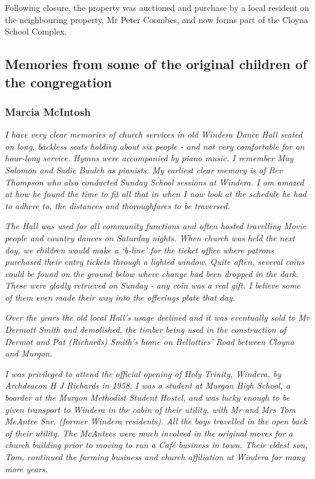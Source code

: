 Following closure, the property was auctioned and purchase by a local resident on the neighbouring property, Mr Peter Coombes, and now forms part of the Cloyna School Complex.



\subsection{Memories from some of the original children of the congregation}



\subsubsection{Marcia McIntosh}



\emph{I have very clear memories of church services in old Windera Dance Hall seated on long, backless seats holding about six people - and not very comfortable for an hour-long service. Hymns were accompanied by piano music. I remember May Solomon and Sadie Baulch as pianists. My earliest clear memory is of Rev Thompson who also conducted Sunday School sessions at Windera. I am amazed at how he found the time to fit all that in when I now look at the schedule he had to adhere to, the distances and thoroughfares to be traversed.}



\emph{The Hall was used for all community functions and often hosted travelling Movie people and country dances on Saturday nights. When church was held the next day, we children would make a `b-line' for the ticket office where patrons purchased their entry tickets through a lighted window. Quite often, several coins could be found on the ground below where change had been dropped in the dark. These were gladly retrieved on Sunday - any coin was a real gift. I believe some of them even made their way into the offerings plate that day.}



\emph{Over the years the old local Hall's usage declined and it was eventually sold to Mr Dermott Smith and demolished, the timber being used in the construction of Dermot and Pat (Richards) Smith's home on Bellotties' Road between Cloyna and Murgon.}



\emph{I was privileged to attend the official opening of Holy Trinity, Windera, by Archdeacon H J Richards in 1958. I was a student at Murgon High School, a boarder at the Murgon Methodist Student Hostel, and was lucky enough to be given transport to Windera in the cabin of their utility, with Mr and Mrs Tom McAntee Snr. (former Windera residents). All the boys travelled in the open back of their utility. The McAntees were much involved in the original moves for a church building prior to moving to run a Café business in town. Their eldest son, Tom, continued the farming business and church affiliation at Windera for many more years.}



